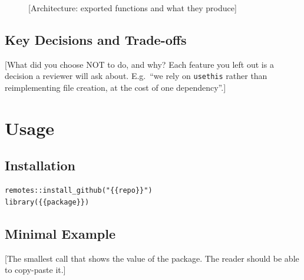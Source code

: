 \begin{figure}[htbp]
    \centering
    \footnotesize
    \caption{[Architecture: exported functions and what they produce]}
    \label{fig:architecture}
\end{figure}

\subsection{Key Decisions and Trade-offs}
[What did you choose NOT to do, and why? Each feature you left out is a decision a reviewer will ask about. E.g.\ \enquote{we rely on \texttt{usethis} rather than reimplementing file creation, at the cost of one dependency}.]

\section{Usage}\label{sec:usage} %

\subsection{Installation}

\begin{lstlisting}
remotes::install_github("{{repo}}")
library({{package}})
\end{lstlisting}

\subsection{Minimal Example}
[The smallest call that shows the value of the package. The reader should be able to copy-paste it.]

